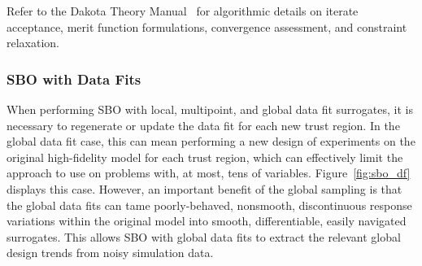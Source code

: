
Refer to the Dakota Theory Manual~\cite{TheoMan} for algorithmic
details on iterate acceptance, merit function formulations,
convergence assessment, and constraint relaxation.


\subsubsection{SBO with Data Fits}\label{adv_meth:sbm:sblm:surface}

When performing SBO with local, multipoint, and global data fit
surrogates, it is necessary to regenerate or update the data fit for
each new trust region.  In the global data fit case, this can mean
performing a new design of experiments on the original high-fidelity
model for each trust region, which can effectively limit the approach
to use on problems with, at most, tens of variables.
Figure~\ref{fig:sbo_df} displays this case.  However, an important
benefit of the global sampling is that the global data fits can tame
poorly-behaved, nonsmooth, discontinuous response variations within
the original model into smooth, differentiable, easily navigated
surrogates.  This allows SBO with global data fits to extract the
relevant global design trends from noisy simulation data.

